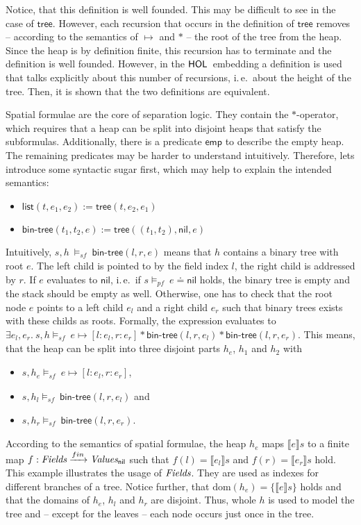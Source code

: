 \documentclass{scrartcl}
\theoremstyle{definition}
\newcommand{\HOL}{{\sf HOL}}
\newcommand{\nil}{{\textsf{nil}}}
\newcommand{\pfequal}[2]{\ensuremath{#1 \doteq #2}}
\newcommand{\values}{{\emph{Values}}}
\newcommand{\valuesnil}{\ensuremath{\values_\nil}}
\newcommand{\fields}{{\emph{Fields}}}
\newcommand{\modelspf}{{\models_{\textit{pf}}\ }}
\newcommand{\modelssf}{{\models_{\textit{sf}}\ }}
\newcommand{\sfemp}{{\textsf{emp}}}
\newcommand{\sftree}{{\textsf{tree}}}
\newcommand{\sfpointsto}[2]{#1 \mapsto [#2]}
\newcommand{\sfbintree}{{\textsf{bin-tree}}}
\newcommand{\sflist}{{\textsf{list}}}
\newcommand{\dom}{{\text{dom}}}
\newcommand{\tofin}{\xrightarrow{fin}}
\begin{document}
Notice, that this definition is well founded. This may be difficult to see in
the case of $\sftree$. However, each recursion that occurs in the definition
of $\sftree$ removes -- according to the semantics of $\mapsto$ and
$*$ -- the root of the tree from the heap. Since the heap is by definition
finite, this recursion has to terminate and the definition is well founded.
However, in the $\HOL$\ embedding a definition is used that talks explicitly
about this number of recursions, i.\,e.\ about the height of the tree. Then, it
is shown that the two definitions are equivalent.
\bigskip

Spatial formulae are the core of separation logic. They contain the
$*$-operator, which requires that a heap can be split into disjoint heaps
that satisfy the subformulas. Additionally, there is a predicate $\sfemp$ to
describe the empty heap. The remaining predicates may be harder to understand
intuitively. Therefore, lets introduce some syntactic sugar first, which may
help to explain the intended semantics:

\begin{itemize}
\item $\sflist(t,e_1,e_2) := \sftree(t,e_2,e_1)$
\item $\sfbintree(t_1,t_2,e) := \sftree((t_1,t_2),\nil,e)$
\end{itemize}

Intuitively, $s, h\ \modelssf \sfbintree(l,r,e)$ means that $h$ contains a 
binary tree with root $e$. The left child is pointed to by the field
index $l$, the right child is addressed by $r$. If $e$ evaluates to $\nil$,
i.\,e.\ if $s \modelspf \pfequal e \nil$ holds, the binary tree is empty and
the stack should be empty as well. Otherwise, one has to check
that the root node $e$ points to a left child $e_l$ and a right child $e_r$ such that 
binary trees exists with these childs as roots. Formally, the expression evaluates to
$\exists e_l,e_r.\ s, h \modelssf \sfpointsto{e}{l:e_l, r:e_r} *
\sfbintree(l,r,e_l) * \sfbintree(l,r,e_r)$. This means, that the heap can be
split into three disjoint parts $h_e$, $h_1$ and $h_2$ with 
\begin{itemize}
  \item $s, h_e \modelssf \sfpointsto{e}{l:e_l, r:e_r}$,
  \item $s, h_l \modelssf \sfbintree(l,r,e_l)$ and
  \item $s, h_r \modelssf \sfbintree(l,r,e_r)$.
\end{itemize}
According to the semantics of spatial formulae, the heap $h_e$ maps $\llbracket e
\rrbracket s$ to a finite map $f:\fields \tofin \valuesnil$ such that
$f(l) = \llbracket e_l \rrbracket s$ and $f(r) = \llbracket e_r \rrbracket
s$ hold. This example illustrates the usage of $\fields$. They are used
as indexes for different branches of a tree. Notice further, that $\dom(h_e) =
\{\llbracket e \rrbracket s\}$ holds and that the domains of $h_e$, $h_l$ and $h_r$
are disjoint. Thus, whole $h$ is used to model the tree and -- except for the
leaves -- each node occurs just once in the tree. 
\end{document}
